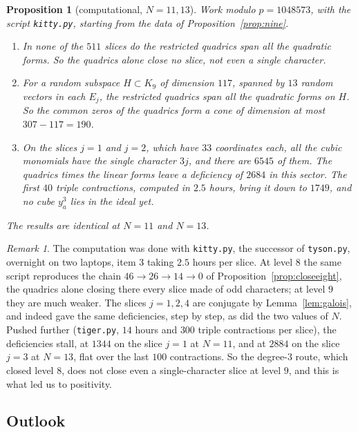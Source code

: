 \documentclass[11pt]{amsart}
\newtheorem{proposition}[theorem]{Proposition}
\theoremstyle{definition}
\theoremstyle{remark}
\newtheorem{remark}[theorem]{Remark}
\theoremstyle{plain}
\numberwithin{equation}{section}
\numberwithin{table}{section}
\begin{document}
\begin{proposition}[computational, $N=11,13$]\label{prop:ninekitty}
Work modulo $p=1048573$, with the script \texttt{kitty.py}, starting from the data of Proposition~\ref{prop:nine}.
\begin{enumerate}
\item In none of the $511$ slices do the restricted quadrics span all the quadratic forms. So the quadrics alone close no slice, not even a single character.
\item For a random subspace $H\subset K_9$ of dimension $117$, spanned by $13$ random vectors in each $E_j$, the restricted quadrics span all the quadratic forms on $H$. So the common zeros of the quadrics form a cone of dimension at most $307-117=190$.
\item On the slices $j=1$ and $j=2$, which have $33$ coordinates each, all the cubic monomials have the single character $3j$, and there are $6545$ of them. The quadrics times the linear forms leave a deficiency of $2684$ in this sector. The first $40$ triple contractions, computed in $2.5$ hours, bring it down to $1749$, and no cube $y_a^3$ lies in the ideal yet.
\end{enumerate}
The results are identical at $N=11$ and $N=13$.
\end{proposition}


\begin{remark}
The computation was done with \texttt{kitty.py}, the successor of \texttt{tyson.py}, overnight on two laptops, item 3 taking $2.5$ hours per slice. At level $8$ the same script reproduces the chain $46\to26\to14\to0$ of Proposition~\ref{prop:closeeight}, the quadrics alone closing there every slice made of odd characters; at level $9$ they are much weaker. The slices $j=1,2,4$ are conjugate by Lemma~\ref{lem:galois}, and indeed gave the same deficiencies, step by step, as did the two values of $N$. Pushed further (\texttt{tiger.py}, $14$ hours and $300$ triple contractions per slice), the deficiencies stall, at $1344$ on the slice $j=1$ at $N=11$, and at $2884$ on the slice $j=3$ at $N=13$, flat over the last $100$ contractions. So the degree-$3$ route, which closed level $8$, does not close even a single-character slice at level $9$, and this is what led us to positivity.
\end{remark}

\subsection{Outlook}
\end{document}
